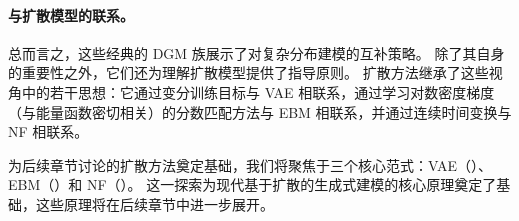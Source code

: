 \begin{table}[th]
  \caption{显式与隐式生成模型的对比}
  \small
  \centering
  \label{tb:comparison-explicit-implicit}
\end{table}


\paragraph{与扩散模型的联系。}
总而言之，这些经典的 DGM 族展示了对复杂分布建模的互补策略。
除了其自身的重要性之外，它们还为理解扩散模型提供了指导原则。
扩散方法继承了这些视角中的若干思想：它通过变分训练目标与 VAE 相联系，通过学习对数密度梯度（与能量函数密切相关）的分数匹配方法与 EBM 相联系，并通过连续时间变换与 NF 相联系。

为后续章节讨论的扩散方法奠定基础，我们将聚焦于三个核心范式：VAE（）、EBM（）和 NF（）。
这一探索为现代基于扩散的生成式建模的核心原理奠定了基础，这些原理将在后续章节中进一步展开。





